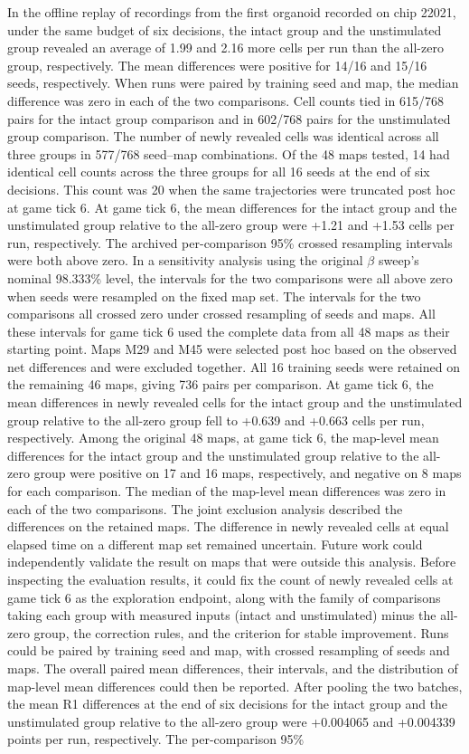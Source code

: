 \documentclass{article}
\begin{document}
In the offline replay of recordings from the first organoid recorded on chip 22021, under the same budget of six decisions, the intact group and the unstimulated group revealed an average of 1.99 and 2.16 more cells per run than the all-zero group, respectively. The mean differences were positive for 14/16 and 15/16 seeds, respectively. When runs were paired by training seed and map, the median difference was zero in each of the two comparisons. Cell counts tied in 615/768 pairs for the intact group comparison and in 602/768 pairs for the unstimulated group comparison. The number of newly revealed cells was identical across all three groups in 577/768 seed--map combinations. Of the 48 maps tested, 14 had identical cell counts across the three groups for all 16 seeds at the end of six decisions. This count was 20 when the same trajectories were truncated post hoc at game tick 6. At game tick 6, the mean differences for the intact group and the unstimulated group relative to the all-zero group were +1.21 and +1.53 cells per run, respectively. The archived per-comparison 95\% crossed resampling intervals were both above zero. In a sensitivity analysis using the original \ensuremath{\beta} sweep's nominal 98.333\% level, the intervals for the two comparisons were all above zero when seeds were resampled on the fixed map set. The intervals for the two comparisons all crossed zero under crossed resampling of seeds and maps. All these intervals for game tick 6 used the complete data from all 48 maps as their starting point. Maps M29 and M45 were selected post hoc based on the observed net differences and were excluded together. All 16 training seeds were retained on the remaining 46 maps, giving 736 pairs per comparison. At game tick 6, the mean differences in newly revealed cells for the intact group and the unstimulated group relative to the all-zero group fell to +0.639 and +0.663 cells per run, respectively. Among the original 48 maps, at game tick 6, the map-level mean differences for the intact group and the unstimulated group relative to the all-zero group were positive on 17 and 16 maps, respectively, and negative on 8 maps for each comparison. The median of the map-level mean differences was zero in each of the two comparisons. The joint exclusion analysis described the differences on the retained maps. The difference in newly revealed cells at equal elapsed time on a different map set remained uncertain. Future work could independently validate the result on maps that were outside this analysis. Before inspecting the evaluation results, it could fix the count of newly revealed cells at game tick 6 as the exploration endpoint, along with the family of comparisons taking each group with measured inputs (intact and unstimulated) minus the all-zero group, the correction rules, and the criterion for stable improvement. Runs could be paired by training seed and map, with crossed resampling of seeds and maps. The overall paired mean differences, their intervals, and the distribution of map-level mean differences could then be reported. After pooling the two batches, the mean R1 differences at the end of six decisions for the intact group and the unstimulated group relative to the all-zero group were +0.004065 and +0.004339 points per run, respectively. The per-comparison 95\% 
\end{document}
